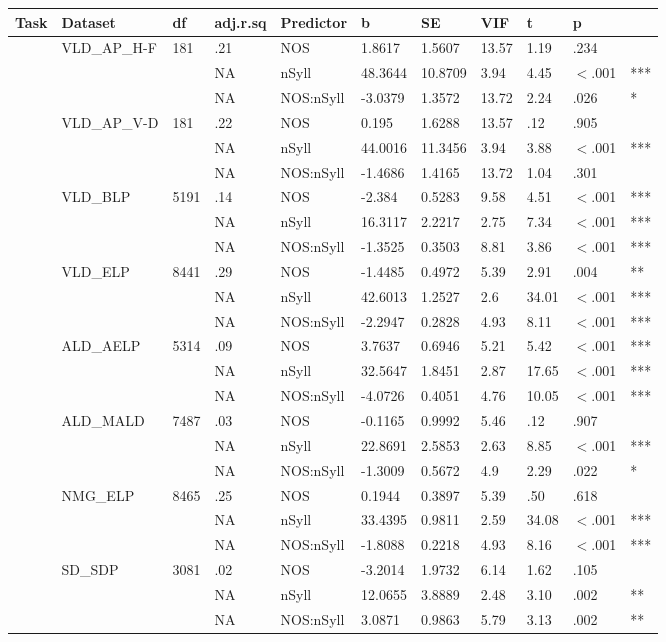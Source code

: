 \begin{table}[ht]
\centering
\begingroup\normalsize
\begin{tabular}{lllllllllll}
  \hline
Task & Dataset & df & adj.r.sq & Predictor & b & SE & VIF & t & p &  \\ 
  \hline
 & VLD\_AP\_H-F & 181 & .21 & NOS & 1.8617 & 1.5607 & 13.57 & 1.19 & .234 &   \\ 
   &  &  & NA & nSyll & 48.3644 & 10.8709 & 3.94 & 4.45 & $<$.001 & *** \\ 
   &  &  & NA & NOS:nSyll & -3.0379 & 1.3572 & 13.72 & 2.24 & .026 & * \\ 
   & VLD\_AP\_V-D & 181 & .22 & NOS & 0.195 & 1.6288 & 13.57 & .12 & .905 &   \\ 
   &  &  & NA & nSyll & 44.0016 & 11.3456 & 3.94 & 3.88 & $<$.001 & *** \\ 
   &  &  & NA & NOS:nSyll & -1.4686 & 1.4165 & 13.72 & 1.04 & .301 &   \\ 
   & VLD\_BLP & 5191 & .14 & NOS & -2.384 & 0.5283 & 9.58 & 4.51 & $<$.001 & *** \\ 
   &  &  & NA & nSyll & 16.3117 & 2.2217 & 2.75 & 7.34 & $<$.001 & *** \\ 
   &  &  & NA & NOS:nSyll & -1.3525 & 0.3503 & 8.81 & 3.86 & $<$.001 & *** \\ 
   & VLD\_ELP & 8441 & .29 & NOS & -1.4485 & 0.4972 & 5.39 & 2.91 & .004 & ** \\ 
   &  &  & NA & nSyll & 42.6013 & 1.2527 & 2.6 & 34.01 & $<$.001 & *** \\ 
   &  &  & NA & NOS:nSyll & -2.2947 & 0.2828 & 4.93 & 8.11 & $<$.001 & *** \\ 
   & ALD\_AELP & 5314 & .09 & NOS & 3.7637 & 0.6946 & 5.21 & 5.42 & $<$.001 & *** \\ 
   &  &  & NA & nSyll & 32.5647 & 1.8451 & 2.87 & 17.65 & $<$.001 & *** \\ 
   &  &  & NA & NOS:nSyll & -4.0726 & 0.4051 & 4.76 & 10.05 & $<$.001 & *** \\ 
   & ALD\_MALD & 7487 & .03 & NOS & -0.1165 & 0.9992 & 5.46 & .12 & .907 &   \\ 
   &  &  & NA & nSyll & 22.8691 & 2.5853 & 2.63 & 8.85 & $<$.001 & *** \\ 
   &  &  & NA & NOS:nSyll & -1.3009 & 0.5672 & 4.9 & 2.29 & .022 & * \\ 
   & NMG\_ELP & 8465 & .25 & NOS & 0.1944 & 0.3897 & 5.39 & .50 & .618 &   \\ 
   &  &  & NA & nSyll & 33.4395 & 0.9811 & 2.59 & 34.08 & $<$.001 & *** \\ 
   &  &  & NA & NOS:nSyll & -1.8088 & 0.2218 & 4.93 & 8.16 & $<$.001 & *** \\ 
   & SD\_SDP & 3081 & .02 & NOS & -3.2014 & 1.9732 & 6.14 & 1.62 & .105 &   \\ 
   &  &  & NA & nSyll & 12.0655 & 3.8889 & 2.48 & 3.10 & .002 & ** \\ 
   &  &  & NA & NOS:nSyll & 3.0871 & 0.9863 & 5.79 & 3.13 & .002 & ** \\ 
   \hline
\end{tabular}
\endgroup
\end{table}
